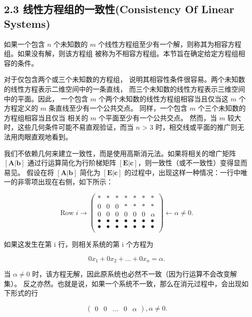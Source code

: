\subsection{2.3 线性方程组的一致性(Consistency Of Linear Systems)}

如果一个包含 \(n\) 个未知数的 \(m\) 个线性方程组至少有一个解，则称其为相容方程组。如果没有解，则该方程组
被称为不相容方程组。本节旨在确定给定方程组相容的条件。

对于仅包含两个或三个未知数的方程组，
说明其相容性条件很容易。两个未知数的线性方程表示二维空间中的一条直线，
而三个未知数的线性方程表示三维空间中的平面。因此，
一个包含 \(m\) 个两个未知数的线性方程组相容当且仅当这 \(m\) 个方程定义的 \(m\) 条直线至少有一个公共交点。
同样，一个包含 \(m\) 个三个未知数的方程组相容当且仅当
相关的 \(m\) 个平面至少有一个公共交点。
然而，当 \(m\) 较大时，这些几何条件可能不易直观验证，而当 \(n\) > 3 时，相交线或平面的推广则无法用肉眼直观地看到。

我们不依赖几何来建立一致性，而是使用高斯消元法。如果将相关的增广矩阵 \([\mathbf{A}|\mathbf{b}]\) 通过行运算简化为行阶梯矩阵 \([\mathbf{E}|\mathbf{c}]\)，则一致性（或不一致性）变得显而易见。
假设在将 \([\mathbf{A}|\mathbf{b}]\) 简化为 \([\mathbf{E}|\mathbf{c}]\) 的过程中，出现这样一种情况：一行中唯一的非零项出现在右侧，如下所示：

\[
\text{Row }i \rightarrow 
\left(\begin{array}{cccccc|c}
* & * & * & * & * & * & * \\ 
0 & 0 & 0 & * & * & * & * \\ 
0 & 0 & 0 & 0 & 0 & 0 & \alpha \\
\bullet & \bullet & \bullet & \bullet & \bullet & \bullet & \bullet \\
\bullet & \bullet & \bullet & \bullet & \bullet & \bullet & \bullet \\
\end{array}\right)
\leftarrow \alpha \neq 0.
\]

如果这发生在第 i 行，则相关系统的第 i 个方程为

\[
0x_1 + 0x_2 + ... + 0x_n = \alpha.
\]

当 \(\alpha \neq 0\) 时，该方程无解，因此原系统也必然不一致（因为行运算不会改变解集）。
反之亦然。也就是说，如果一个系统不一致，那么在消元过程中，会出现如下形式的行

\[
\left(\begin{array}{cccccc|c}
0 & 0 & ... & 0 & \alpha
\end{array}\right), \alpha \neq 0.
\]

